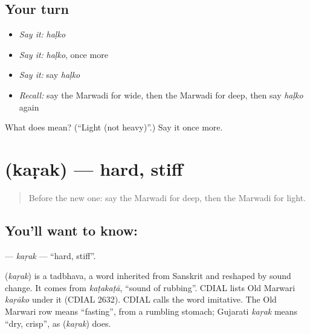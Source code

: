 \subsection*{Your turn}
\begin{itemize}
\raggedright
  \item \emph{Say it:} \emph{haḷko}
  \item \emph{Say it:} \emph{haḷko}, once more
  \item \emph{Say it:} say \emph{haḷko}
  \item \emph{Recall:} say the Marwadi for wide, then the Marwadi for deep, then say \emph{haḷko} again
\end{itemize}

\begin{tcolorbox}[breakable,colback=teal!4,colframe=teal!35!black,title={Before you move on}]
What does  mean? (\textquotedblleft{}Light (not heavy)\textquotedblright{}.) Say it once more.
\end{tcolorbox}
\section[\texorpdfstring{\mw{कड़क} (kaṛak)}{कड़क (kaṛak)}]{ (kaṛak) — hard, stiff}

\label{lesson:MW-C142-karak}



\begin{quote}
Before the new one: say the Marwadi for deep, then the Marwadi for light.
\end{quote}

\subsection*{You'll want to know: }
\textbf{} — \emph{kaṛak} — \textquotedblleft{}hard, stiff\textquotedblright{}.

\begin{cousinweb}
\textbf{} (\emph{kaṛak}) is a tadbhava, a word inherited from Sanskrit and reshaped by sound change. It comes from \emph{kaṭakaṭā}, \textquotedblleft{}sound of rubbing\textquotedblright{}. CDIAL lists Old Marwari \emph{kaṛāko} under it (CDIAL 2632). CDIAL calls the word imitative. The Old Marwari row means \textquotedblleft{}fasting\textquotedblright{}, from a rumbling stomach; Gujarati \emph{kaṛak} means \textquotedblleft{}dry, crisp\textquotedblright{}, as \textbf{} (\emph{kaṛak}) does.
\end{cousinweb}

